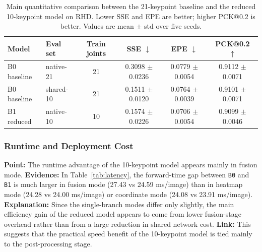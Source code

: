 \documentclass[10pt,letterpaper]{article}
\begin{document}
\begin{table}[t]
\centering
\footnotesize
\caption{Main quantitative comparison between the 21-keypoint baseline and the reduced 10-keypoint model on RHD. Lower SSE and EPE are better; higher PCK@0.2 is better. Values are mean $\pm$ std over five seeds.}
\label{tab:main_accuracy}
\begin{tabular}{llcccc}
\toprule
Model & Eval set & Train joints & SSE $\downarrow$ & EPE $\downarrow$ & PCK@0.2 $\uparrow$ \\
\midrule
B0 baseline & native-21 & 21 & 0.3098 $\pm$ 0.0236 & 0.0779 $\pm$ 0.0054 & 0.9112 $\pm$ 0.0071 \\
B0 baseline & shared-10 & 21 & 0.1511 $\pm$ 0.0120 & 0.0764 $\pm$ 0.0039 & 0.9101 $\pm$ 0.0071 \\
B1 reduced & native-10 & 10 & 0.1574 $\pm$ 0.0226 & 0.0706 $\pm$ 0.0054 & 0.9099 $\pm$ 0.0046 \\
\bottomrule
\end{tabular}
\end{table}

\subsubsection{Runtime and Deployment Cost}

\medskip
\noindent\textbf{Point:} The runtime advantage of the 10-keypoint model appears mainly in fusion mode.  
\textbf{Evidence:} In Table~\ref{tab:latency}, the forward-time gap between \texttt{B0} and \texttt{B1} is much larger in fusion mode (27.43 vs 24.59 ms/image) than in heatmap mode (24.28 vs 24.00 ms/image) or coordinate mode (24.08 vs 23.91 ms/image).  
\textbf{Explanation:} Since the single-branch modes differ only slightly, the main efficiency gain of the reduced model appears to come from lower fusion-stage overhead rather than from a large reduction in shared network cost.  
\textbf{Link:} This suggests that the practical speed benefit of the 10-keypoint model is tied mainly to the post-processing stage.
\end{document}
